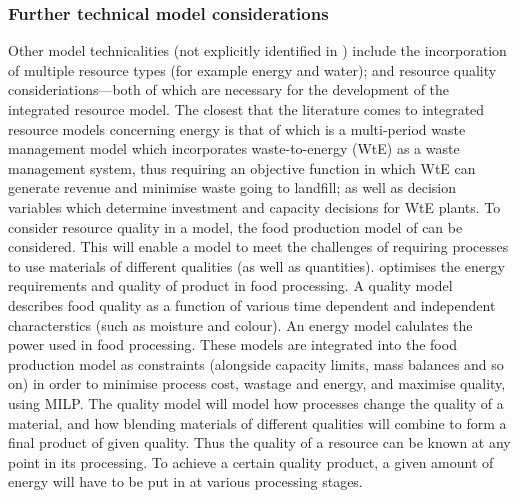 \subsubsection{Further technical model considerations}
Other model technicalities (not explicitly identified in \citet{Keirstead2012b}) include the incorporation of multiple resource types (for example energy and water); and resource quality consideriations---both of which are necessary for the development of the integrated resource model. The closest that the literature comes to integrated resource models concerning energy is that of \citet{Lu2009} which is a multi-period waste management model which incorporates waste-to-energy (WtE) as a waste management system, thus requiring an objective function in which WtE can generate revenue and minimise waste going to landfill; as well as decision variables which determine investment and capacity decisions for WtE plants. To consider resource quality in a model, the food production model of \citet{Mehdizadeh} can be considered. This will enable a model to meet the challenges of requiring processes to use materials of different qualities (as well as quantities). \citet{Mehdizadeh2011} optimises the energy requirements and quality of product in food processing. A quality model describes food quality as a function of various time dependent and independent characterstics (such as moisture and colour). An energy model calulates the power used in food processing. These models are integrated into the food production model as constraints (alongside capacity limits, mass balances and so on) in order to minimise process cost, wastage and energy, and maximise quality, using MILP. The quality model will model how processes change the quality of a material, and how blending materials of different qualities will combine to form a final product of given quality. Thus the quality of a resource can be known at any point in its processing. To achieve a certain quality product, a given amount of energy will have to be put in at various processing stages.

